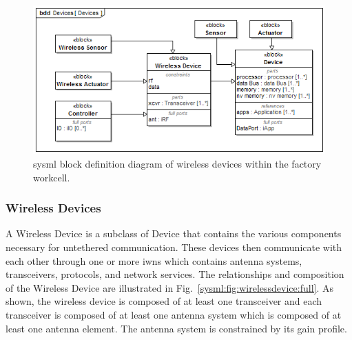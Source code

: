 \begin{figure}[H]
	\centering
	\includegraphics[width=0.95\columnwidth]{./chapter-sysml/diagrams/bdd__Devices__Devices}%
	\caption{\gls{sysml} block definition diagram of wireless devices within the factory workcell.}%
	\label{sysml:fig:bdd:devices}
\end{figure}



\subsubsection{Wireless Devices}\label{sysml:sec:devices:wireless-device} 
A Wireless Device is a subclass of Device that contains the various components necessary for untethered communication.  These devices then communicate with each other through one or more \glspl{iwn} which contains antenna systems, transceivers, protocols, and network services.  The relationships and composition of the Wireless Device are illustrated in Fig.~\ref{sysml:fig:wirelessdevice:full}. As shown, the wireless device is composed of at least one transceiver and each transceiver is composed of at least one antenna system which is composed of at least one antenna element.  The antenna system is constrained by its gain profile.


